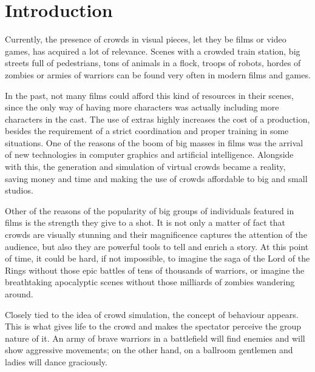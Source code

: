 
\ifx\isEmbedded\undefined

\graphicspath{{../img/}}

\fi

\chapter{Introduction}
\label{chap:intro}

Currently, the presence of crowds in visual pieces, let they be films or video games, has acquired a lot of relevance. Scenes with a crowded train station, big streets full of pedestrians, tons of animals in a flock, troops of robots, hordes of zombies or armies of warriors can be found very often in modern films and games.

In the past, not many films could afford this kind of resources in their scenes, since the only way of having more characters was actually including more characters in the cast. The use of extras highly increases the cost of a production, besides the requirement of a strict coordination and proper training in some situations. One of the reasons of the boom of big masses in films was the arrival of new technologies in computer graphics and artificial intelligence. Alongside with this, the generation and simulation of virtual crowds became a reality, saving money and time and making the use of crowds affordable to big and small studios.

Other of the reasons of the popularity of big groups of individuals featured in films is the strength they give to a shot. It is not only a matter of fact that crowds are visually stunning and their magnificence captures the attention of the audience, but also they are powerful tools to tell and enrich a story. At this point of time, it could be hard, if not impossible, to imagine the saga of the Lord of the Rings without those epic battles of tens of thousands of warriors, or imagine the breathtaking apocalyptic scenes without those milliards of zombies wandering around.

Closely tied to the idea of crowd simulation, the concept of behaviour appears. This is what gives life to the crowd and makes the spectator perceive the group nature of it. An army of brave warriors in a battlefield will find enemies and will show aggressive movements; on the other hand, on a ballroom gentlemen and ladies will dance graciously.

